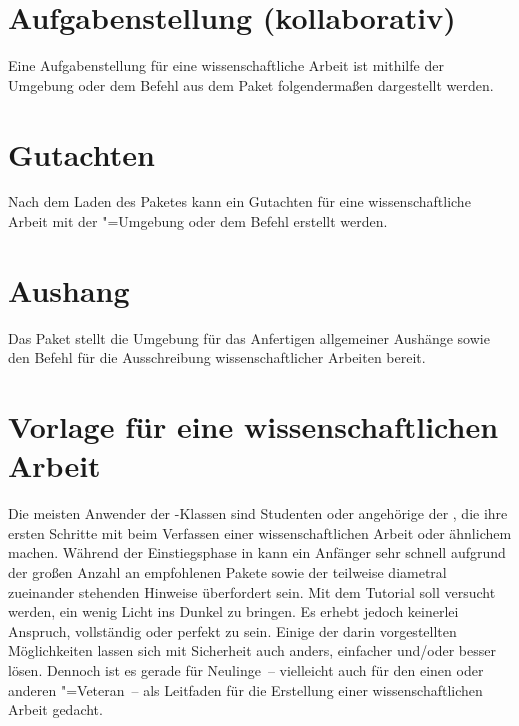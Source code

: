 \section{Aufgabenstellung (kollaborativ)}
\label{sec:exmpl:task}
Eine Aufgabenstellung für eine wissenschaftliche Arbeit ist mithilfe der 
Umgebung  oder dem Befehl  aus dem Paket 
 folgendermaßen dargestellt werden.

\section{Gutachten}
\label{sec:exmpl:evaluation}
Nach dem Laden des Paketes  kann ein Gutachten für 
eine wissenschaftliche Arbeit mit der "=Umgebung oder 
dem Befehl  erstellt werden.

\section{Aushang}
\label{sec:exmpl:notice}
Das Paket  stellt die Umgebung  
für das Anfertigen allgemeiner Aushänge sowie den Befehl  
für die Ausschreibung wissenschaftlicher Arbeiten bereit.

\section{Vorlage für eine wissenschaftlichen Arbeit}
\label{sec:exmpl:treatise}
Die meisten Anwender der \TUDScript-Klassen sind Studenten oder angehörige der 
\TnUD, die ihre ersten Schritte mit  beim Verfassen einer 
wissenschaftlichen Arbeit oder ähnlichem machen. Während der Einstiegsphase in 
 kann ein Anfänger sehr schnell aufgrund der großen Anzahl an 
empfohlenen Pakete sowie der teilweise diametral zueinander stehenden Hinweise 
überfordert sein. Mit dem Tutorial  soll versucht werden, 
ein wenig Licht ins Dunkel zu bringen. Es erhebt jedoch keinerlei Anspruch, 
vollständig oder perfekt zu sein. Einige der darin vorgestellten Möglichkeiten 
lassen sich mit Sicherheit auch anders, einfacher und/oder besser lösen. 
Dennoch ist es gerade für Neulinge~-- vielleicht auch für den einen oder 
anderen "=Veteran~-- als Leitfaden für die Erstellung einer 
wissenschaftlichen Arbeit gedacht.

